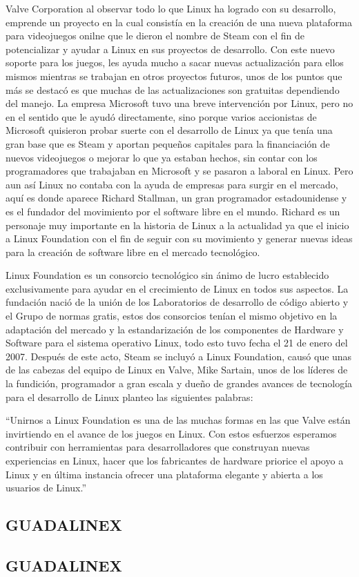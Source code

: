 Valve Corporation al observar todo lo que Linux ha logrado con
su desarrollo, emprende un proyecto en la cual consistía en la
creación de una nueva plataforma para videojuegos onilne que
le dieron el nombre de Steam con el fin de potencializar y
ayudar a Linux en sus proyectos de desarrollo. Con este nuevo
soporte para los juegos, les ayuda mucho a sacar nuevas
actualización para ellos mismos mientras se trabajan en otros
proyectos futuros, unos de los puntos que más se destacó es que
muchas de las actualizaciones son gratuitas dependiendo del
manejo. La empresa Microsoft tuvo una breve intervención por
Linux, pero no en el sentido que le ayudó directamente, sino
porque varios accionistas de Microsoft quisieron probar suerte
con el desarrollo de Linux ya que tenía una gran base que es
Steam y aportan pequeños capitales para la financiación de
nuevos videojuegos o mejorar lo que ya estaban hechos, sin
contar con los programadores que trabajaban en Microsoft y se
pasaron a laboral en Linux. Pero aun así Linux no contaba con la
ayuda de empresas para surgir en el mercado, aquí es donde
aparece Richard Stallman, un gran programador estadounidense
y es el fundador del movimiento por el software libre en el
mundo. Richard es un personaje muy importante en la historia
de Linux a la actualidad ya que el inicio a Linux Foundation con
el fin de seguir con su movimiento y generar nuevas ideas para
la creación de software libre en el mercado tecnológico.

Linux Foundation es un consorcio tecnológico sin ánimo de lucro
establecido exclusivamente para ayudar en el crecimiento de
Linux en todos sus aspectos. La fundación nació de la unión de
los Laboratorios de desarrollo de código abierto y el Grupo de
normas gratis, estos dos consorcios tenían el mismo objetivo en
la adaptación del mercado y la estandarización de los
componentes de Hardware y Software para el sistema operativo
Linux, todo esto tuvo fecha el 21 de enero del 2007. Después de
este acto, Steam se incluyó a Linux Foundation, causó que unas
de las cabezas del equipo de Linux en Valve, Mike Sartain, unos
de los líderes de la fundición, programador a gran escala y
dueño de grandes avances de tecnología para el desarrollo de
Linux planteo las siguientes palabras:

“Unirnos a Linux Foundation es una de las muchas
formas en las que Valve están invirtiendo en el
avance de los juegos en Linux. Con estos esfuerzos
esperamos contribuir con herramientas para
desarrolladores que construyan nuevas
experiencias en Linux, hacer que los fabricantes
de hardware priorice el apoyo a Linux y en última
instancia ofrecer una plataforma elegante y
abierta a los usuarios de Linux.”

\subsection*{GUADALINEX}
\subsection*{GUADALINEX}
